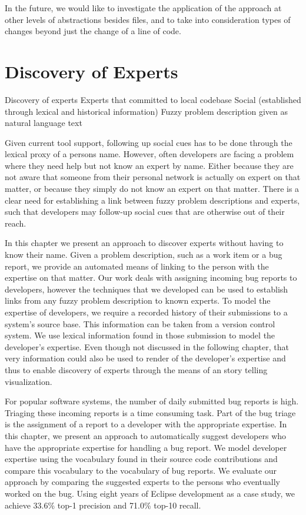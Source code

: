 In the future, we would like to investigate the application of the approach at other levels of abstractions besides files, and to take into consideration types of changes beyond just the change of a line of code.


\chapter{Discovery of Experts}
\label{the chapter on bug reports}

\infobox
	{Discovery of experts}
	{Experts that committed to local codebase}
	{Social (established through lexical and historical information)}
	{Fuzzy problem description given as natural language text}

Given current tool support, following up social cues has to be done through the lexical proxy of a persons name. However, often developers are facing a problem where they need help but not know an expert by name. Either because they are not aware that someone from their personal network is actually on expert on that matter, or because they simply do not know an expert on that matter. There is a clear need for establishing a link between fuzzy problem descriptions and experts, such that developers may follow-up social cues that are otherwise out of their reach. 

In this chapter we present an approach to discover experts without having to know their name. Given a problem description, such as a work item or a bug report, we provide an automated means of linking to the person with the expertise on that matter. Our work deals with assigning incoming bug reports to developers, however the techniques that we developed can be used to establish links from any fuzzy problem description to known experts. To model the expertise of developers, we require a recorded history of their submissions to a system's source base. This information can be taken from a version control system. We use lexical information found in those submission to model the developer's expertise. Even though not discussed in the following chapter, that very information could also be used to render \EVOCLOUDS of the developer's expertise and thus to enable discovery of experts through the means of an story telling visualization.

\asteriskasteriskasterisk

For popular software systems, the number of daily submitted bug reports is high. Triaging these incoming reports is a time consuming task. Part of the bug triage is the assignment of a report to a developer with the appropriate expertise. In this chapter, we present an approach to automatically suggest developers who have the appropriate expertise for handling a bug report. We model developer expertise using the vocabulary found in their source code contributions and compare this vocabulary to the vocabulary of bug reports. We evaluate our approach by comparing the suggested experts to the persons who eventually worked on the bug. Using eight years of Eclipse development as a case study, we achieve 33.6\% top-1 precision and 71.0\% top-10 recall.

